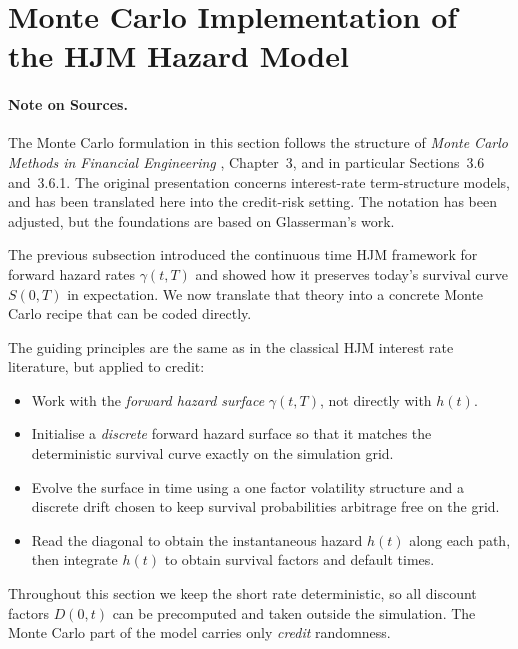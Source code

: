
\section{Monte Carlo Implementation of the HJM Hazard Model}

\paragraph{Note on Sources.}
The Monte Carlo formulation in this section follows the structure of 
\cite{glasserman2004} \textit{Monte Carlo Methods in Financial Engineering} 
, Chapter~3, and in particular Sections~3.6 and~3.6.1.  
The original presentation concerns interest-rate term-structure models, 
and has been translated here into the credit-risk setting.  
The notation has been adjusted, but the foundations are based on Glasserman's work.

The previous subsection introduced the continuous time HJM framework for
forward hazard rates $\gamma(t,T)$ and showed how it preserves today’s survival
curve $S(0,T)$ in expectation. We now translate that theory into a concrete
Monte Carlo recipe that can be coded directly.

The guiding principles are the same as in the classical HJM interest rate
literature, but applied to credit:

\begin{itemize}
    \item Work with the \emph{forward hazard surface} $\gamma(t,T)$, not directly
          with $h(t)$.
    \item Initialise a \emph{discrete} forward hazard surface so that it matches
          the deterministic survival curve exactly on the simulation grid.
    \item Evolve the surface in time using a one factor volatility structure and
          a discrete drift chosen to keep survival probabilities arbitrage free
          on the grid.
    \item Read the diagonal to obtain the instantaneous hazard $h(t)$ along each
          path, then integrate $h(t)$ to obtain survival factors and default
          times.
\end{itemize}

Throughout this section we keep the short rate deterministic, so all discount
factors $D(0,t)$ can be precomputed and taken outside the simulation. The Monte
Carlo part of the model carries only \emph{credit} randomness. 

